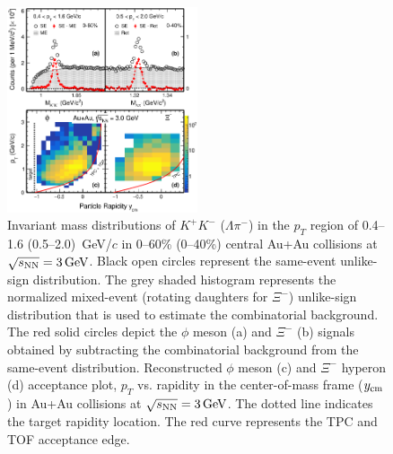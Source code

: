 \documentclass[%
 reprint,	
showpacs,
 amsmath,amssymb,
 aps,
 superscriptaddress,
]{revtex4-1}
\begin{document}
\begin{figure}
\centering
\hspace*{-4mm}
\includegraphics[width=0.50\textwidth]{fig1_signal.eps}
  \caption{Invariant mass distributions of $K^+K^-$ ($\Lambda\pi^-$) in the $p_T$ region of 0.4--1.6 (0.5--2.0) \,GeV/$c$ in 0--60\% (0--40\%) central Au+Au collisions at ${\sqrt{s_{\rm NN}} = \rm{3\,GeV}}$. Black open circles represent the same-event unlike-sign distribution. The grey shaded histogram represents the normalized mixed-event (rotating daughters for $\Xi^-$) unlike-sign distribution that is used to estimate the combinatorial background. The red solid circles depict the $\phi$ meson (a) and $\Xi^-$ (b) signals obtained by subtracting the combinatorial background from the same-event distribution. Reconstructed $\phi$ meson (c) and $\Xi^-$ hyperon (d) acceptance plot, $p_T$ vs. rapidity in the center-of-mass frame ($y_{\rm cm}$) in Au+Au collisions at ${\sqrt{s_{\rm NN}} = \rm{3\,GeV}}$. The dotted line indicates the target rapidity location. The red curve represents the TPC and TOF acceptance edge.}
\label{fig:phiSignal} 
\end{figure}
\end{document}

